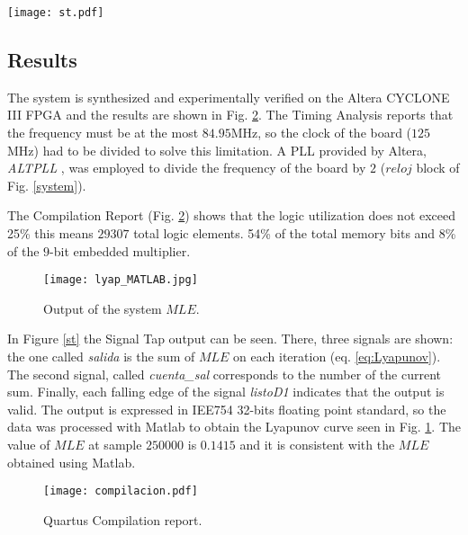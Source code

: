 \begin{figure*}
    \centering
    \texttt{[image: st.pdf]}\\
    \caption{Quartus Signal Tap output.}\label{st}
\end{figure*}

\subsection{Results}

The system is  synthesized and experimentally  verified on the
Altera CYCLONE III FPGA and the results are shown in Fig.
\ref{compilacion}. The Timing Analysis reports that the frequency
must be at the most $84.95$MHz, so the clock of the board
($125$MHz) had to be divided to solve this limitation. A PLL
provided by Altera, \textit{ALTPLL} \cite{MEGAFUNCTIONS}, was
employed to divide the frequency of the board
 by $2$ ($reloj$ block of Fig. \ref{system}).

The Compilation Report (Fig. \ref{compilacion}) shows that the
logic utilization does not exceed 25\% this means $29307$ total
logic elements. 54\% of the total memory bits and 8\% of the
$9$-bit embedded multiplier.

\label{sec:resultados}
\begin{figure}
    \centering
    \texttt{[image: lyap\_MATLAB.jpg]}\\
    \caption{Output of the system $MLE$.}\label{lyapu}
\end{figure}

In Figure \ref{st} the Signal Tap output can be seen. There, three
signals are shown: the one called \textit{salida} is the sum of
$MLE$ on each iteration (eq. \ref{eq:Lyapunov}). The second signal, called
\textit{cuenta\_sal} corresponds to the number of the current sum.
Finally, each falling edge of the signal \textit{listoD1}
indicates that the output is valid. The output is expressed in
IEE754 32-bits floating point standard, so the data was processed
with Matlab to obtain the Lyapunov curve seen in Fig. \ref{lyapu}. The value of $MLE$ at sample $250000$ is $ 0.1415$ and it is consistent with the $MLE$ obtained using Matlab.



\begin{figure}
    \centering
    \texttt{[image: compilacion.pdf]}\\
    \caption{Quartus Compilation report.}\label{compilacion}
\end{figure}


